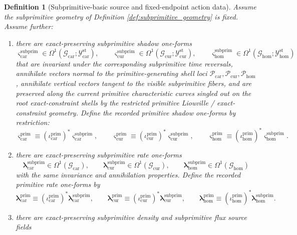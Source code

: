 \documentclass[11pt]{article}
\newcommand{\TensorStatTagClass}{\mathcal Y_{\mathrm{car}}^{\mathrm{st}}}
\newcommand{\CurStatTagClass}{\mathcal Y_{\mathrm{cur}}^{\mathrm{st}}}
\newcommand{\HomStatTagClass}{\mathcal Y_{\mathrm{hom}}^{\mathrm{st}}}
\newcommand{\TensorPrimitiveSpace}{\mathcal P_{\mathrm{car}}}
\newcommand{\CurPrimitiveSpace}{\mathcal P_{\mathrm{cur}}}
\newcommand{\HomPrimitiveSpace}{\mathcal P_{\mathrm{hom}}}
\newcommand{\TensorPrimitiveShadowForm}{\boldsymbol{\varsigma}_{\mathrm{car}}^{\mathrm{prim}}}
\newcommand{\CurPrimitiveShadowForm}{\boldsymbol{\varsigma}_{\mathrm{cur}}^{\mathrm{prim}}}
\newcommand{\HomPrimitiveShadowForm}{\boldsymbol{\varsigma}_{\mathrm{hom}}^{\mathrm{prim}}}
\newcommand{\TensorPrimitiveRateForm}{\boldsymbol{\lambda}_{\mathrm{car}}^{\mathrm{prim}}}
\newcommand{\CurPrimitiveRateForm}{\boldsymbol{\lambda}_{\mathrm{cur}}^{\mathrm{prim}}}
\newcommand{\HomPrimitiveRateForm}{\boldsymbol{\lambda}_{\mathrm{hom}}^{\mathrm{prim}}}
\newcommand{\TensorSubprimitiveSpace}{\mathcal G_{\mathrm{car}}}
\newcommand{\CurSubprimitiveSpace}{\mathcal G_{\mathrm{cur}}}
\newcommand{\HomSubprimitiveSpace}{\mathcal G_{\mathrm{hom}}}
\newcommand{\TensorPrimitiveInc}{\iota_{\mathrm{car}}^{\mathrm{prim}}}
\newcommand{\CurPrimitiveInc}{\iota_{\mathrm{cur}}^{\mathrm{prim}}}
\newcommand{\HomPrimitiveInc}{\iota_{\mathrm{hom}}^{\mathrm{prim}}}
\newcommand{\TensorSubprimitiveShadowForm}{\boldsymbol{\varsigma}_{\mathrm{car}}^{\mathrm{subprim}}}
\newcommand{\CurSubprimitiveShadowForm}{\boldsymbol{\varsigma}_{\mathrm{cur}}^{\mathrm{subprim}}}
\newcommand{\HomSubprimitiveShadowForm}{\boldsymbol{\varsigma}_{\mathrm{hom}}^{\mathrm{subprim}}}
\newcommand{\TensorSubprimitiveRateForm}{\boldsymbol{\lambda}_{\mathrm{car}}^{\mathrm{subprim}}}
\newcommand{\CurSubprimitiveRateForm}{\boldsymbol{\lambda}_{\mathrm{cur}}^{\mathrm{subprim}}}
\newcommand{\HomSubprimitiveRateForm}{\boldsymbol{\lambda}_{\mathrm{hom}}^{\mathrm{subprim}}}
\newtheorem{definition}{Definition}
\begin{document}
\begin{definition}[Subprimitive-basic source and fixed-endpoint action data]
\label{def:subprimitive_basic}
Assume the subprimitive geometry of Definition \ref{def:subprimitive_geometry} is fixed. Assume further:
\begin{enumerate}
    \item there are exact-preserving subprimitive shadow one-forms
    \[
    \TensorSubprimitiveShadowForm\in\Omega^1(\TensorSubprimitiveSpace;\TensorStatTagClass),\qquad
    \CurSubprimitiveShadowForm\in\Omega^1(\CurSubprimitiveSpace;\CurStatTagClass),\qquad
    \HomSubprimitiveShadowForm\in\Omega^1(\HomSubprimitiveSpace;\HomStatTagClass)
    \]
    that are invariant under the corresponding subprimitive time reversals, annihilate vectors normal to the primitive-generating shell loci \(\TensorPrimitiveSpace,\CurPrimitiveSpace,\HomPrimitiveSpace\), annihilate vertical vectors tangent to the visible subprimitive fibers, and are preserved along the current primitive characteristic curves singled out on the root exact-constraint shells by the restricted primitive Liouville / exact-constraint geometry. Define the recorded primitive shadow one-forms by restriction:
    \begin{equation}
    \TensorPrimitiveShadowForm\equiv(\TensorPrimitiveInc)^*\TensorSubprimitiveShadowForm,\qquad
    \CurPrimitiveShadowForm\equiv(\CurPrimitiveInc)^*\CurSubprimitiveShadowForm,\qquad
    \HomPrimitiveShadowForm\equiv(\HomPrimitiveInc)^*\HomSubprimitiveShadowForm.
    \label{eq:primitive_shadow_from_subprimitive}
    \end{equation}
    \item there are exact-preserving subprimitive rate one-forms
    \[
    \TensorSubprimitiveRateForm\in\Omega^1(\TensorSubprimitiveSpace),\qquad
    \CurSubprimitiveRateForm\in\Omega^1(\CurSubprimitiveSpace),\qquad
    \HomSubprimitiveRateForm\in\Omega^1(\HomSubprimitiveSpace)
    \]
    with the same invariance and annihilation properties. Define the recorded primitive rate one-forms by
    \begin{equation}
    \TensorPrimitiveRateForm\equiv(\TensorPrimitiveInc)^*\TensorSubprimitiveRateForm,\qquad
    \CurPrimitiveRateForm\equiv(\CurPrimitiveInc)^*\CurSubprimitiveRateForm,\qquad
    \HomPrimitiveRateForm\equiv(\HomPrimitiveInc)^*\HomSubprimitiveRateForm.
    \label{eq:primitive_rate_from_subprimitive}
    \end{equation}
    \item there are exact-preserving subprimitive density and subprimitive flux source fields

\end{enumerate}
\end{definition}
\end{document}
